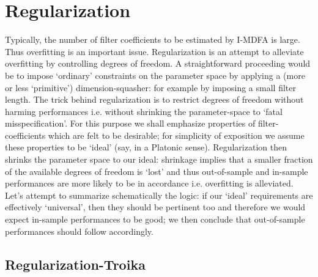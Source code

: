 \documentclass[11pt]{article}
\begin{document}
\section{Regularization}\label{reg}


Typically, the number of filter coefficients to be estimated by I-MDFA is large. Thus overfitting is an important issue. Regularization is an attempt to alleviate overfitting by 
controlling degrees of freedom. A straightforward proceeding would be to impose `ordinary' constraints on the parameter space by applying a (more or less `primitive')  
dimension-squasher: for example by imposing a small filter length. The trick behind regularization is to restrict degrees of freedom without 
harming performances i.e. without shrinking the parameter-space to `fatal misspecification'. For this purpose we shall emphasize properties of filter-coefficients which are  felt to be  desirable; for simplicity of exposition we assume these properties to be `ideal' (say, in a Platonic sense). Regularization then shrinks the parameter space to our  ideal: shrinkage implies that a smaller fraction of the available degrees of freedom is `lost' and thus  out-of-sample and in-sample performances are more likely to be in accordance i.e. overfitting is alleviated.\\
Let's attempt to summarize schematically the logic: if our `ideal' requirements are effectively `universal', then they should be pertinent too and therefore we would expect in-sample performances to be good; we then conclude that out-of-sample performances should follow accordingly. 




\subsection{Regularization-Troika}\label{regtro}
\end{document}
